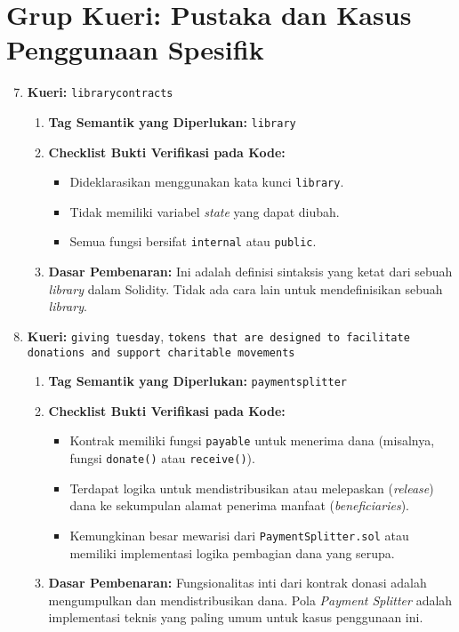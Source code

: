 \section{Grup Kueri: Pustaka dan Kasus Penggunaan Spesifik}
\begin{enumerate}
    \setcounter{enumi}{6}
    \item \textbf{Kueri:} \texttt{library\textunderscore contracts}
    \begin{enumerate}
        \item \textbf{Tag Semantik yang Diperlukan:} \texttt{library}
        \item \textbf{Checklist Bukti Verifikasi pada Kode:}
        \begin{itemize}
            \item Dideklarasikan menggunakan kata kunci \texttt{library}.
            \item Tidak memiliki variabel \textit{state} yang dapat diubah.
            \item Semua fungsi bersifat \texttt{internal} atau \texttt{public}.
        \end{itemize}
        \item \textbf{Dasar Pembenaran:} Ini adalah definisi sintaksis yang ketat dari sebuah \textit{library} dalam Solidity. Tidak ada cara lain untuk mendefinisikan sebuah \textit{library}.
    \end{enumerate}
    \item \textbf{Kueri:} \texttt{giving tuesday}, \texttt{tokens that are designed to facilitate donations and support charitable movements}
    \begin{enumerate}
        \item \textbf{Tag Semantik yang Diperlukan:} \texttt{payment\textunderscore splitter}
        \item \textbf{Checklist Bukti Verifikasi pada Kode:}
        \begin{itemize}
            \item Kontrak memiliki fungsi \texttt{payable} untuk menerima dana (misalnya, fungsi \texttt{donate()} atau \texttt{receive()}).
            \item Terdapat logika untuk mendistribusikan atau melepaskan (\textit{release}) dana ke sekumpulan alamat penerima manfaat (\textit{beneficiaries}).
            \item Kemungkinan besar mewarisi dari \texttt{PaymentSplitter.sol} atau memiliki implementasi logika pembagian dana yang serupa.
        \end{itemize}
        \item \textbf{Dasar Pembenaran:} Fungsionalitas inti dari kontrak donasi adalah mengumpulkan dan mendistribusikan dana. Pola \textit{Payment Splitter} adalah implementasi teknis yang paling umum untuk kasus penggunaan ini.
    \end{enumerate}
\end{enumerate}